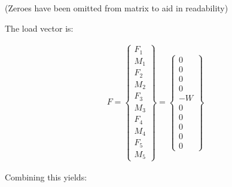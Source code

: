 \documentclass[10pt,letterpaper]{article}
\begin{document}
	(Zeroes have been omitted from matrix to aid in readability)

	The load vector is:

	\begin{align}
		{F} = 
		\begin{Bmatrix}
			F_1 \\
			M_1 \\
			F_2 \\
			M_2 \\
			F_3 \\
			M_3 \\
			F_4 \\
			M_4 \\
			F_5 \\
			M_5
		\end{Bmatrix} = 
		\begin{Bmatrix}
			0 \\
			0 \\
			0 \\
			0 \\
			-W \\
			0 \\
			0 \\
			0 \\
			0 \\
			0
		\end{Bmatrix}
	\end{align}

	Combining this yields:
\end{document}

